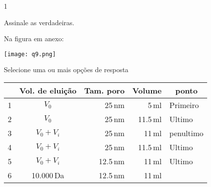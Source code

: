 \documentclass[\mainfilename]{subfiles}
\begin{document}
\begin{questionBox}1{} %
    
    Assinale as verdadeiras.

    Na figura em anexo:
    \begin{center}
        \texttt{[image: q9.png]}
    \end{center}

    Selecione uma ou mais opções de resposta
    \begin{center}
        \begin{tabular}{c c r r l}
            
            \toprule
            
               &\multicolumn{1}{c}{Vol. de eluição}
               &\multicolumn{1}{c}{Tam. poro}
               &\multicolumn{1}{c}{Volume}
               &\multicolumn{1}{c}{ponto}
            
            \\\midrule
            
                1 
                & \(V_0\) 
                & 25\,\unit{\nano\metre}
                & 5\,\unit{\milli\litre}
                & Primeiro
                \\
                2 
                & \(V_0\) 
                & 25\,\unit{\nano\metre}
                & 11.5\,\unit{\milli\litre}
                & Ultimo
                \\
                3
                & \(V_0 + V_i\) 
                & 25\,\unit{\nano\metre}
                & 11\,\unit{\milli\litre}
                & penultimo
                \\
                4
                & \(V_0 + V_i\) 
                & 25\,\unit{\nano\metre}
                & 11.5\,\unit{\milli\litre}
                & Ultimo
                \\
                5
                & \(V_0 + V_i\) 
                & 12.5\,\unit{\nano\metre}
                & 11\,\unit{\milli\litre}
                & Ultimo
                \\
                6
                & 10.000\,\unit{\dalton}
                & 12.5\,\unit{\nano\metre}
                & 11\,\unit{\milli\litre}
                & 
            
            \\\bottomrule
            
        \end{tabular}
    \end{center}


\end{questionBox}
\end{document}
